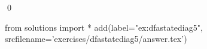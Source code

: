 
\begin{ex} 
  \label{ex:dfastatediag5}
  
  \qed
\end{ex} 
\begin{python0}
from solutions import *
add(label="ex:dfastatediag5",
    srcfilename='exercises/dfastatediag5/answer.tex') 
\end{python0}
